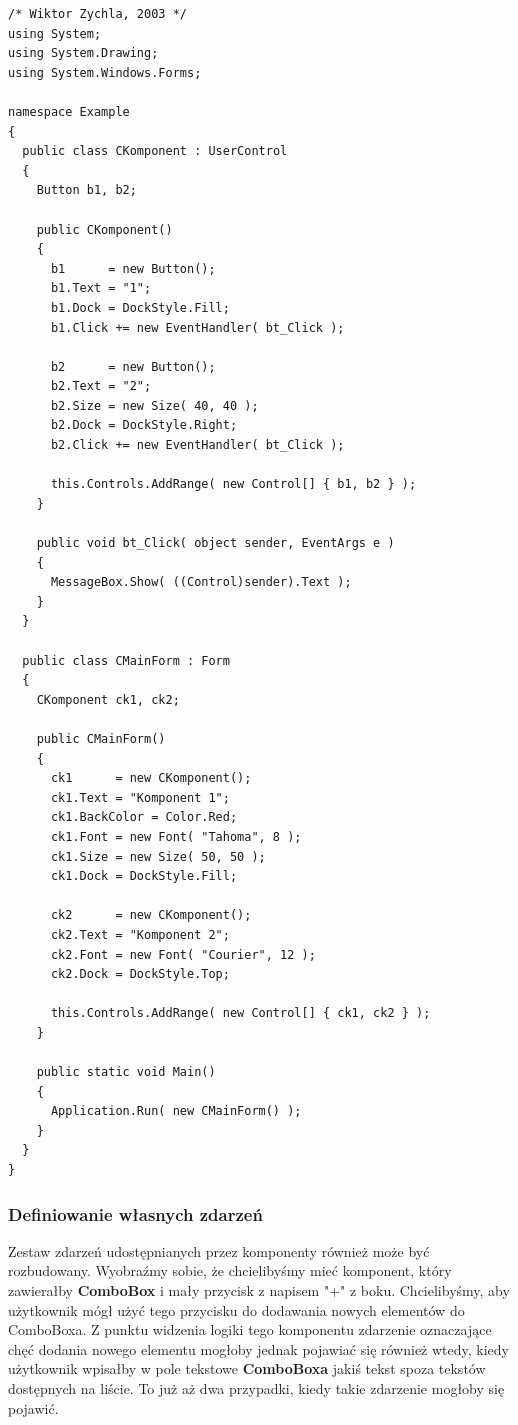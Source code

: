 \begin{scriptsize}
\begin{verbatim}
/* Wiktor Zychla, 2003 */
using System;
using System.Drawing;
using System.Windows.Forms;

namespace Example
{
  public class CKomponent : UserControl
  {
    Button b1, b2;

    public CKomponent() 
    {
      b1      = new Button();
      b1.Text = "1";
      b1.Dock = DockStyle.Fill;
      b1.Click += new EventHandler( bt_Click );

      b2      = new Button();
      b2.Text = "2";
      b2.Size = new Size( 40, 40 );
      b2.Dock = DockStyle.Right;
      b2.Click += new EventHandler( bt_Click );

      this.Controls.AddRange( new Control[] { b1, b2 } );
    }

    public void bt_Click( object sender, EventArgs e )
    {
      MessageBox.Show( ((Control)sender).Text );
    } 
  }

  public class CMainForm : Form
  {  
    CKomponent ck1, ck2;

    public CMainForm() 
    {
      ck1      = new CKomponent();
      ck1.Text = "Komponent 1";
      ck1.BackColor = Color.Red;
      ck1.Font = new Font( "Tahoma", 8 );
      ck1.Size = new Size( 50, 50 );
      ck1.Dock = DockStyle.Fill;

      ck2      = new CKomponent();
      ck2.Text = "Komponent 2";
      ck2.Font = new Font( "Courier", 12 );
      ck2.Dock = DockStyle.Top;

      this.Controls.AddRange( new Control[] { ck1, ck2 } );
    }

    public static void Main()
    {    
      Application.Run( new CMainForm() );
    }
  }
}
\end{verbatim}
\end{scriptsize}

\subsubsection{Definiowanie własnych zdarzeń}

Zestaw zdarzeń udostępnianych przez komponenty również może być rozbudowany. Wyobraźmy sobie, że
chcielibyśmy mieć komponent, który zawierałby {\bf ComboBox} i mały przycisk z napisem "+" z boku.
Chcielibyśmy, aby użytkownik mógł użyć tego przycisku do dodawania nowych elementów do ComboBoxa.
Z punktu widzenia logiki tego komponentu zdarzenie oznaczające chęć dodania nowego elementu mogłoby
jednak pojawiać się również wtedy, kiedy użytkownik wpisałby w pole tekstowe {\bf ComboBoxa} jakiś tekst spoza
tekstów dostępnych na liście. To już aż dwa przypadki, kiedy takie zdarzenie mogłoby się pojawić.


